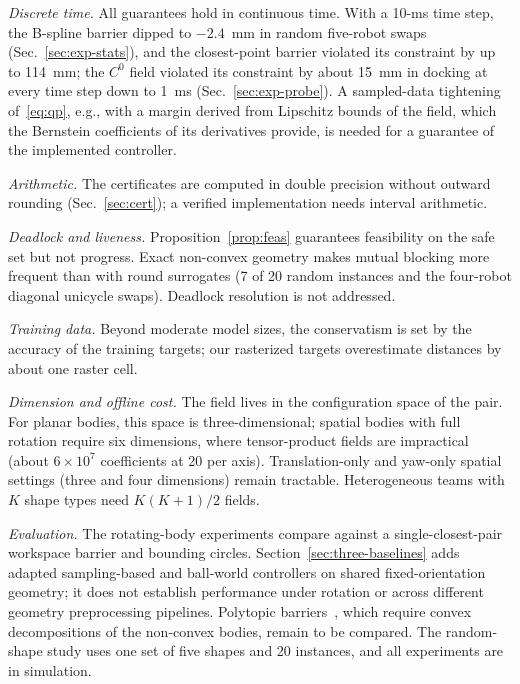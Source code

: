 \documentclass[journal]{IEEEtran}
\theoremstyle{definition}
\begin{document}
\emph{Discrete time.} All guarantees hold in continuous time. With a 10-ms time step, the B-spline
barrier dipped to $-2.4$~mm in random five-robot swaps (Sec.~\ref{sec:exp-stats}), and the
closest-point barrier violated its constraint by up to 114~mm; the $C^0$ field violated its
constraint by about 15~mm in docking at every time step down to 1~ms (Sec.~\ref{sec:exp-probe}). A sampled-data tightening
of~\eqref{eq:qp}, e.g., with a margin derived from Lipschitz bounds of the field, which the Bernstein
coefficients of its derivatives provide, is needed for a guarantee of the implemented controller.

\emph{Arithmetic.} The certificates are computed in double precision without outward rounding
(Sec.~\ref{sec:cert}); a verified implementation needs interval arithmetic.

\emph{Deadlock and liveness.} Proposition~\ref{prop:feas} guarantees feasibility on the safe set but
not progress. Exact non-convex geometry makes mutual blocking more frequent than with round
surrogates (7 of 20 random instances and the four-robot diagonal unicycle swaps).
Deadlock resolution is not addressed.

\emph{Training data.} Beyond moderate model sizes, the conservatism is set by the accuracy of the
training targets; our rasterized targets overestimate distances by about one raster cell.

\emph{Dimension and offline cost.} The field lives in the configuration space of the pair. For
planar bodies, this space is three-dimensional; spatial bodies with full rotation require six
dimensions, where tensor-product fields are impractical (about $6\times10^7$ coefficients at 20 per
axis). Translation-only and yaw-only spatial settings (three and four dimensions) remain tractable.
Heterogeneous teams with $K$ shape types need $K(K+1)/2$ fields.

\emph{Evaluation.} The rotating-body experiments compare against a single-closest-pair workspace
barrier and bounding circles. Section~\ref{sec:three-baselines} adds adapted sampling-based and
ball-world controllers on shared fixed-orientation geometry; it does not establish performance
under rotation or across different geometry preprocessing pipelines. Polytopic
barriers~\cite{chen2025minkowski,chen2026exact,thirugnanam2025strongly}, which require convex
decompositions of the non-convex bodies, remain to be compared. The random-shape study uses one set
of five shapes and 20 instances, and all experiments are in simulation.
\end{document}
